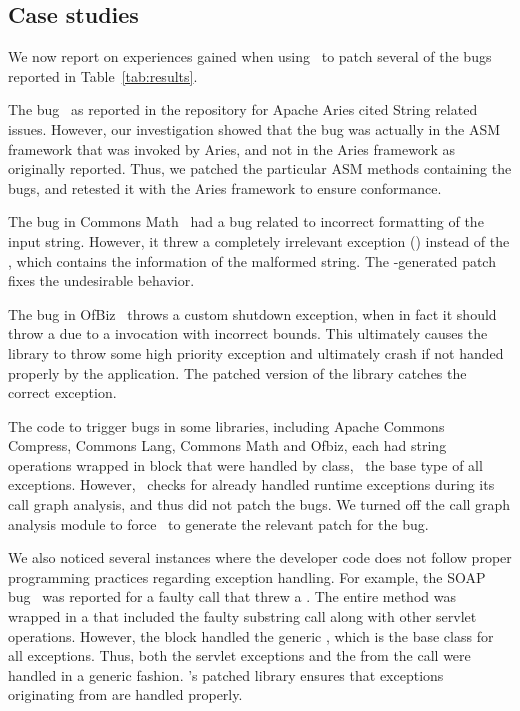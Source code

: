 \subsection{Case studies}
\label{sub:casestudies}

We now report on experiences gained when using \tool\ to patch several of the
bugs reported in Table~\ref{tab:results}.

\begin{mylist}

 \item The bug~\cite{ARIES1204} as reported in the repository for Apache Aries
cited String related issues. However, our investigation showed that the bug was
actually in the ASM framework that was invoked by Aries, and not in the Aries
framework as originally reported. Thus, we patched the particular ASM methods
containing the bugs, and retested it with the Aries framework to ensure
conformance.

 \item The bug in Commons Math~\cite{MATH198} had a bug related to incorrect
formatting of the input string. However, it threw a completely irrelevant
exception () instead of the ,
which contains the information of the malformed string. The \tool-generated
patch fixes the undesirable behavior.

 \item The bug in OfBiz~\cite{OFBIZ4237} throws a custom shutdown exception,
when in fact it should throw a  due to a
 invocation with incorrect bounds. This ultimately causes the
library to throw some high priority exception and ultimately crash if not handed
properly by the application. The patched version of the library catches the
correct exception.

 \item The code to trigger bugs in some libraries, including Apache Commons
Compress, Commons Lang, Commons Math and Ofbiz, each had string operations
wrapped in  block that were handled by  class,
\ie\ the base type of all exceptions. However, \tool\ checks for already
handled runtime exceptions during its call graph analysis, and thus did not
patch the bugs. We turned off the call graph analysis module to force \tool\ to
generate the relevant patch for the bug.

 \item We also noticed several instances where the developer code does not
follow proper programming practices regarding exception handling. For example,
the SOAP bug~\cite{SOAP130} was reported for a faulty  call that
threw a . The entire method was wrapped in
a  that included the faulty substring call along with other
servlet operations. However, the  block handled the generic
, which is the base class for all exceptions. Thus, both the
servlet exceptions and the  from the
 call were handled in a generic fashion. \tool's patched library
ensures that exceptions originating from  are handled properly.

\end{mylist}